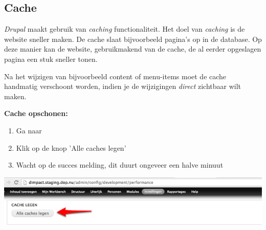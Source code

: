 \subsection{Cache}\label{cache}
\emph{Drupal} maakt gebruik van \emph{caching} functionaliteit. Het doel van \emph{caching} is de website sneller maken. De cache slaat bijvoorbeeld pagina's op in de database. Op deze manier kan de website, gebruikmakend van de cache, de al eerder opgeslagen pagina een stuk sneller tonen. 

Na het wijzigen van bijvoorbeeld content of menu-items moet de cache handmatig verschoont worden, indien je de wijzigingen \emph{direct} zichtbaar wilt maken. 

\textbf{Cache opschonen:}

\begin{enumerate}
\item Ga naar  
\item Klik op de knop 'Alle caches legen'
\item Wacht op de succes melding, dit duurt ongeveer een halve minuut
\end{enumerate}

\begin{center}
	\includegraphics[width=\textwidth]{img/cache.png}
\end{center}